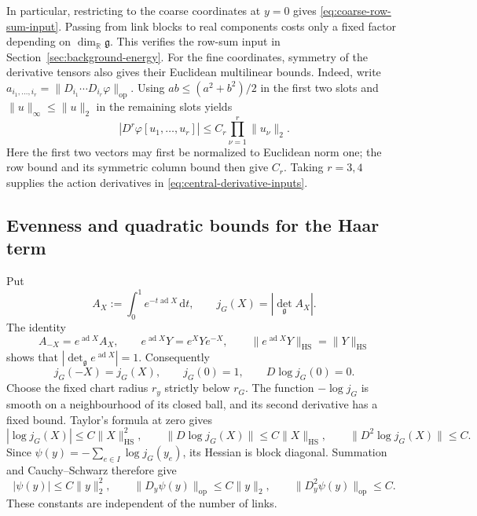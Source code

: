 \documentclass[10pt,reqno]{amsart}
\theoremstyle{definition}
\theoremstyle{remark}
\numberwithin{equation}{section}
\numberwithin{figure}{section}
\newcommand{\g}{\mathfrak g}
\newcommand{\dd}{\mathrm d}
\newcommand{\R}{\mathbb R}
\DeclareMathOperator{\ad}{ad}
\begin{document}
In particular, restricting to the coarse coordinates at $y=0$ gives
\eqref{eq:coarse-row-sum-input}. Passing from link blocks to real
components costs only a fixed factor depending on $\dim_\R\g$.
This verifies the row-sum input in Section~\ref{sec:background-energy}.
For the fine coordinates, symmetry of the derivative tensors also gives
their Euclidean multilinear bounds. Indeed, write
$a_{i_1,\ldots,i_r}=\|D_{i_1}\cdots D_{i_r}\varphi\|_{\mathrm{op}}$.
Using $ab\le(a^2+b^2)/2$ in the first two slots and
$\|u\|_\infty\le\|u\|_2$ in the remaining slots yields
\begin{equation}\label{eq:local-derivatives-euclidean-bound}
|D^r\varphi[u_1,\ldots,u_r]|
\le C_r\prod_{\nu=1}^r\|u_\nu\|_2.
\end{equation}
Here the first two vectors may first be normalized to Euclidean norm
one; the row bound and its symmetric column bound then give $C_r$.
Taking $r=3,4$ supplies the action derivatives in
\eqref{eq:central-derivative-inputs}.

\subsection{Evenness and quadratic bounds for the Haar term}
Put
\begin{equation}\label{eq:haar-AX-definition}
A_X:=\int_0^1e^{-t\ad X}\,\dd t,\qquad j_G(X)=|\det_\g A_X|.
\end{equation}
The identity
\begin{equation}\label{eq:haar-evenness-calculation}
A_{-X}=e^{\ad X}A_X,\qquad
e^{\ad X}Y=e^XYe^{-X},\qquad
\|e^{\ad X}Y\|_{\mathrm{HS}}=\|Y\|_{\mathrm{HS}}
\end{equation}
shows that $|\det_\g e^{\ad X}|=1$. Consequently
\begin{equation}\label{eq:haar-density-even}
j_G(-X)=j_G(X),\qquad j_G(0)=1,\qquad D\log j_G(0)=0.
\end{equation}
Choose the fixed chart radius $r_y$ strictly below $r_G$. The function
$-\log j_G$ is smooth on a neighbourhood of its closed ball, and its
second derivative has a fixed bound. Taylor's formula at zero gives
\begin{equation}\label{eq:one-link-haar-bounds}
|\log j_G(X)|\le C\|X\|_{\mathrm{HS}}^2,\qquad
\|D\log j_G(X)\|\le C\|X\|_{\mathrm{HS}},\qquad
\|D^2\log j_G(X)\|\le C.
\end{equation}
Since $\psi(y)=-\sum_{e\in I}\log j_G(y_e)$, its Hessian is block
diagonal. Summation and Cauchy--Schwarz therefore give
\begin{equation}\label{eq:haar-euclidean-bounds}
\boxed{|\psi(y)|\le C\|y\|_2^2,\qquad
\|D_y\psi(y)\|_{\mathrm{op}}\le C\|y\|_2,\qquad
\|D_y^2\psi(y)\|_{\mathrm{op}}\le C.}
\end{equation}
These constants are independent of the number of links.
\end{document}
